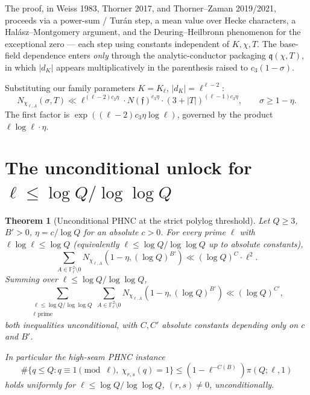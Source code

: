 \documentclass[11pt]{article}
\newtheorem{theorem}{Theorem}
\newcommand{\F}{\mathbb F}
\begin{document}
The proof, in Weiss 1983, Thorner 2017, and Thorner--Zaman 2019/2021, proceeds via a power-sum / Tur\'an step, a mean value over Hecke characters, a Hal\'asz--Montgomery argument, and the Deuring--Heilbronn phenomenon for the exceptional zero --- each step using constants independent of $K,\chi,T$.  The base-field dependence enters \emph{only} through the analytic-conductor packaging $\mathfrak q(\chi,T)$, in which $|d_K|$ appears multiplicatively in the parenthesis raised to $c_3(1-\sigma)$.

Substituting our family parameters $K=K_\ell$, $|d_K|=\ell^{\ell-2}$:
\[
N_{\chi_{\ell,A}}(\sigma,T)\ll\ell^{(\ell-2)c_3\eta}\cdot N(\mathfrak f)^{c_3\eta}\cdot(3+|T|)^{(\ell-1)c_3\eta},
\qquad\sigma\ge 1-\eta.
\]
The first factor is $\exp((\ell-2)c_3\eta\log\ell)$, governed by the product $\ell\log\ell\cdot\eta$.

\section{The unconditional unlock for $\ell\le\log Q/\log\log Q$}\label{S:unlock}

\begin{theorem}[Unconditional PHNC at the strict polylog threshold]\label{T:unlock}
Let $Q\ge 3$, $B'>0$, $\eta=c/\log Q$ for an absolute $c>0$.  For every prime $\ell$ with $\ell\log\ell\le\log Q$ (equivalently $\ell\le\log Q/\log\log Q$ up to absolute constants),
\[
\sum_{A\in\F_\ell^2\setminus 0}N_{\chi_{\ell,A}}(1-\eta,(\log Q)^{B'})\ll(\log Q)^{C}\cdot\ell^{2}.
\]
Summing over $\ell\le\log Q/\log\log Q$,
\[
\sum_{\substack{\ell\le\log Q/\log\log Q\\\ell\text{ prime}}}\sum_{A\in\F_\ell^2\setminus 0}N_{\chi_{\ell,A}}(1-\eta,(\log Q)^{B'})\ll(\log Q)^{C'},
\]
both inequalities unconditional, with $C,C'$ absolute constants depending only on $c$ and $B'$.

In particular the high-seam PHNC instance
\[
\#\{q\le Q:q\equiv 1\!\!\!\!\pmod\ell,\ \chi_{r,s}(q)=1\}\le(1-\ell^{-C(B)})\pi(Q;\ell,1)
\]
holds uniformly for $\ell\le\log Q/\log\log Q$, $(r,s)\ne 0$, unconditionally.
\end{theorem}
\end{document}

